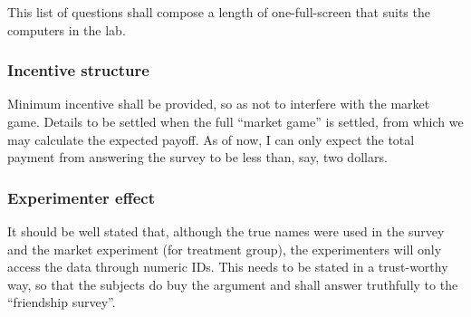 This list of questions shall compose a length of one-full-screen that suits the
computers in the lab.

\subsubsection{Incentive structure}

Minimum incentive shall be provided, so as not to interfere with the market
game. Details to be settled when the full ``market game'' is settled, from which
we may calculate the expected payoff. As of now, I can only expect the total
payment from answering the survey to be less than, say, two dollars.

\subsubsection{Experimenter effect}

It should be well stated that, although the true names were used in the survey
and the market experiment (for treatment group), the experimenters will only
access the data through numeric IDs. This needs to be stated in a trust-worthy
way, so that the subjects do buy the argument and shall answer truthfully to the
``friendship survey''.
